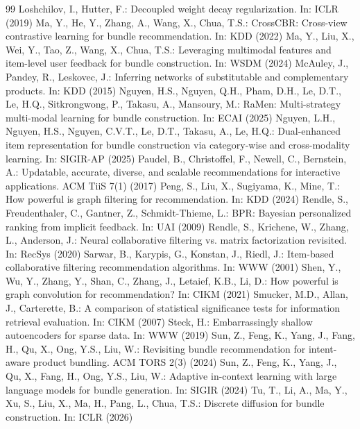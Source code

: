 \documentclass[runningheads]{llncs}
\begin{document}
\begin{thebibliography}{99}
 Loshchilov, I., Hutter, F.: Decoupled weight decay regularization. In: ICLR (2019)
 Ma, Y., He, Y., Zhang, A., Wang, X., Chua, T.S.: CrossCBR: Cross-view contrastive learning for bundle recommendation. In: KDD (2022)
 Ma, Y., Liu, X., Wei, Y., Tao, Z., Wang, X., Chua, T.S.: Leveraging multimodal features and item-level user feedback for bundle construction. In: WSDM (2024)
 McAuley, J., Pandey, R., Leskovec, J.: Inferring networks of substitutable and complementary products. In: KDD (2015)
 Nguyen, H.S., Nguyen, Q.H., Pham, D.H., Le, D.T., Le, H.Q., Sitkrongwong, P., Takasu, A., Mansoury, M.: RaMen: Multi-strategy multi-modal learning for bundle construction. In: ECAI (2025)
 Nguyen, L.H., Nguyen, H.S., Nguyen, C.V.T., Le, D.T., Takasu, A., Le, H.Q.: Dual-enhanced item representation for bundle construction via category-wise and cross-modality learning. In: SIGIR-AP (2025)
 Paudel, B., Christoffel, F., Newell, C., Bernstein, A.: Updatable, accurate, diverse, and scalable recommendations for interactive applications. ACM TiiS 7(1) (2017)
 Peng, S., Liu, X., Sugiyama, K., Mine, T.: How powerful is graph filtering for recommendation. In: KDD (2024)
 Rendle, S., Freudenthaler, C., Gantner, Z., Schmidt-Thieme, L.: BPR: Bayesian personalized ranking from implicit feedback. In: UAI (2009)
 Rendle, S., Krichene, W., Zhang, L., Anderson, J.: Neural collaborative filtering vs. matrix factorization revisited. In: RecSys (2020)
 Sarwar, B., Karypis, G., Konstan, J., Riedl, J.: Item-based collaborative filtering recommendation algorithms. In: WWW (2001)
 Shen, Y., Wu, Y., Zhang, Y., Shan, C., Zhang, J., Letaief, K.B., Li, D.: How powerful is graph convolution for recommendation? In: CIKM (2021)
 Smucker, M.D., Allan, J., Carterette, B.: A comparison of statistical significance tests for information retrieval evaluation. In: CIKM (2007)
 Steck, H.: Embarrassingly shallow autoencoders for sparse data. In: WWW (2019)
 Sun, Z., Feng, K., Yang, J., Fang, H., Qu, X., Ong, Y.S., Liu, W.: Revisiting bundle recommendation for intent-aware product bundling. ACM TORS 2(3) (2024)
 Sun, Z., Feng, K., Yang, J., Qu, X., Fang, H., Ong, Y.S., Liu, W.: Adaptive in-context learning with large language models for bundle generation. In: SIGIR (2024)
 Tu, T., Li, A., Ma, Y., Xu, S., Liu, X., Ma, H., Pang, L., Chua, T.S.: Discrete diffusion for bundle construction. In: ICLR (2026)

\end{thebibliography}
\end{document}
